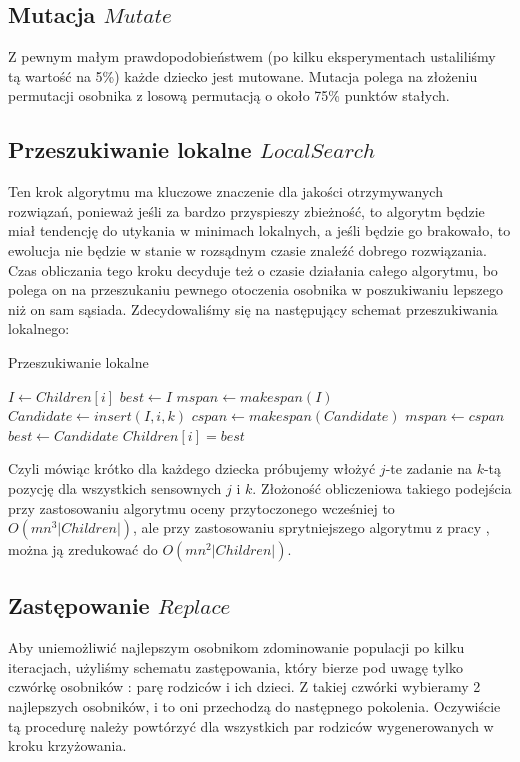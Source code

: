 \documentclass[11pt, a4wide]{article}
\begin{document}
\subsection{Mutacja $Mutate$}
Z pewnym małym prawdopodobieństwem (po kilku eksperymentach ustaliliśmy tą wartość na 5\%) każde dziecko jest
mutowane. Mutacja polega na złożeniu permutacji osobnika z losową permutacją o około 75\% punktów stałych.

\subsection{Przeszukiwanie lokalne $LocalSearch$}
Ten krok algorytmu ma kluczowe znaczenie dla jakości otrzymywanych rozwiązań, ponieważ jeśli za bardzo przyspieszy
zbieżność, to algorytm będzie miał tendencję do utykania w minimach lokalnych, a jeśli będzie go brakowało, 
to ewolucja nie będzie w stanie w rozsądnym czasie znaleźć dobrego rozwiązania. Czas obliczania tego kroku
decyduje też o czasie działania całego algorytmu, bo polega on na przeszukaniu pewnego otoczenia osobnika
w poszukiwaniu lepszego niż on sam sąsiada. Zdecydowaliśmy się na następujący schemat przeszukiwania lokalnego:
\begin{algorithm}[H]
\caption{Przeszukiwanie lokalne}
\label{localsearch}
\begin{algorithmic}
    \State $I \gets Children[i]$
    \State $best \gets I$
    \State $mspan \gets makespan(I)$
        \State $Candidate \gets insert(I, i, k)$
        \State $cspan \gets makespan(Candidate)$
          \State $mspan \gets cspan$
          \State $best \gets Candidate$
        \EndIf
      \EndFor
    \EndFor
    \State $Children[i] = best$
  \EndFor
\end{algorithmic}
\end{algorithm}
Czyli mówiąc krótko dla każdego dziecka próbujemy włożyć $j$-te zadanie na $k$-tą pozycję dla 
wszystkich sensownych $j$ i $k$. Złożoność obliczeniowa takiego podejścia przy zastosowaniu algorytmu
oceny przytoczonego wcześniej to $O(mn^3|Children|)$, ale przy zastosowaniu sprytniejszego algorytmu
z pracy \cite{tai90}, można ją zredukować do $O(mn^2|Children|)$.

\subsection{Zastępowanie $Replace$}
Aby uniemożliwić najlepszym osobnikom zdominowanie populacji po kilku iteracjach, użyliśmy schematu
zastępowania, który bierze pod uwagę tylko czwórkę osobników : parę rodziców i ich dzieci. Z takiej
czwórki wybieramy 2 najlepszych osobników, i to oni przechodzą do następnego pokolenia. Oczywiście
tą procedurę należy powtórzyć dla wszystkich par rodziców wygenerowanych w kroku krzyżowania.
\end{document}
